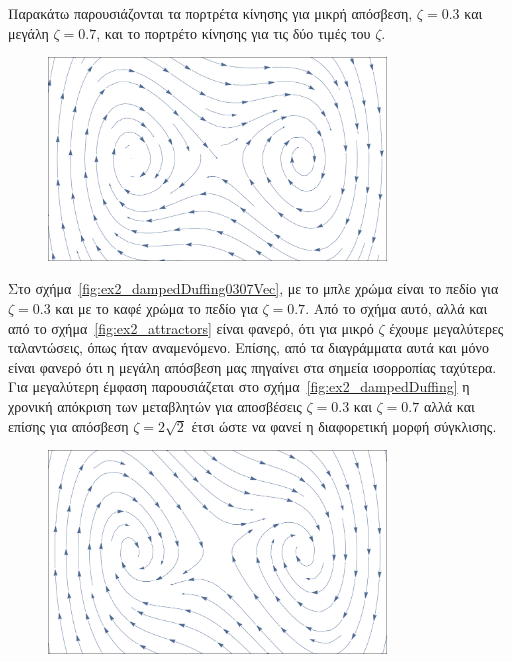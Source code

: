 \begin{solution}
    Παρακάτω παρουσιάζονται τα πορτρέτα κίνησης για μικρή απόσβεση,
    \( \zeta = 0.3 \) και μεγάλη \( \zeta = 0.7 \), και το πορτρέτο κίνησης
    για τις δύο τιμές του \( \zeta \).
    \begin{figure}[h]
        \centering
        \includegraphics[width=0.8\textwidth]{figures/ex2_dampedDuffing03Vec.pdf}
        \caption{}
        \label{fig:ex2_dampedDuffing03Vec}
    \end{figure}
    Στο σχήμα~\ref{fig:ex2_dampedDuffing0307Vec}, με το μπλε χρώμα είναι το πεδίο
    για \( \zeta = 0.3 \) και με το καφέ χρώμα το πεδίο για
    \( \zeta = 0.7 \). Από το σχήμα αυτό, αλλά και από το
    σχήμα~\ref{fig:ex2_attractors} είναι φανερό, ότι για μικρό \( \zeta \)
    έχουμε μεγαλύτερες ταλαντώσεις, όπως ήταν αναμενόμενο. Επίσης, από τα διαγράμματα
    αυτά και μόνο είναι φανερό ότι η μεγάλη απόσβεση μας πηγαίνει στα σημεία ισορροπίας
    ταχύτερα. Για μεγαλύτερη έμφαση παρουσιάζεται στο
    σχήμα~\ref{fig:ex2_dampedDuffing} η χρονική απόκριση των μεταβλητών για
    αποσβέσεις \( \zeta = 0.3 \) και \( \zeta = 0.7 \) αλλά και επίσης για
    απόσβεση \( \zeta = 2\sqrt{2} \) έτσι ώστε να φανεί η διαφορετική μορφή σύγκλισης.
    \begin{figure}[h!]
        \centering
        \includegraphics[width=0.8\textwidth]{figures/ex2_dampedDuffing07Vec.pdf}

\end{figure}
\end{solution}
